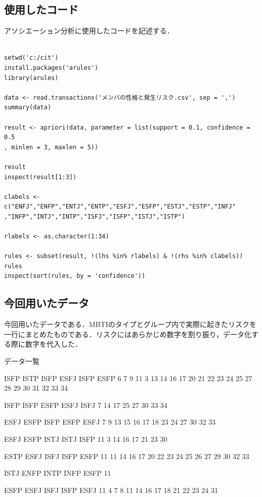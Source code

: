 \subsection{使用したコード}

アソシエーション分析に使用したコードを記述する．\\

\begin{verbatim}

setwd('c:/cit')
install.packages('arules')
library(arules)

data <- read.transactions('メンバの性格と発生リスク.csv', sep = ',')
summary(data)

result <- apriori(data, parameter = list(support = 0.1, confidence = 0.5
, minlen = 3, maxlen = 5))

result
inspect(result[1:3])

clabels <- c("ENFJ","ENFP","ENTJ","ENTP","ESFJ","ESFP","ESTJ","ESTP","INFJ"
,"INFP","INTJ","INTP","ISFJ","ISFP","ISTJ","ISTP")

rlabels <- as.character(1:34)

rules <- subset(result, !(lhs %in% rlabels) & !(rhs %in% clabels))
rules
inspect(sort(rules, by = 'confidence'))

\end{verbatim}
\newpage
\subsection{今回用いたデータ}
今回用いたデータである．MBTIのタイプとグループ内で実際に起きたリスクを一行にまとめたものである．リスクにはあらかじめ数字を割り振り，データ化する際に数字を代入した．

データ一覧

ISFP	ISTP	ISFP	ESFJ	ISFP	ESFP	6	7	9	11	3	13	14	16	17	20	21	22	23	24	25	27	28	29	30	31	32	33	34		

ISFP	ISFP	ESFP	ESFJ	ISFJ	7	14	17	25	27	30	33	34																		

ESFJ	ESFP	ISFP	ESFP	ESFJ	7	9	13	15	16	17	18	23	24	27	30	32	33													

ESFJ	ESFP	ISTJ	ISTJ	ISFP	11	3	14	16	17	21	23	30																		

ESTP	ESFJ	ISFJ	ISFP	ESFP	11	11	14	16	17	20	22	23	24	25	26	27	29	30	32	33										

ISTJ	ENFP	INTP	INFP	ESFP	11																									

ESFP	ESFJ	ISFJ	ISFP	ESFJ	11	4	7	8	11	14	16	17	18	21	22	23	24	31												

